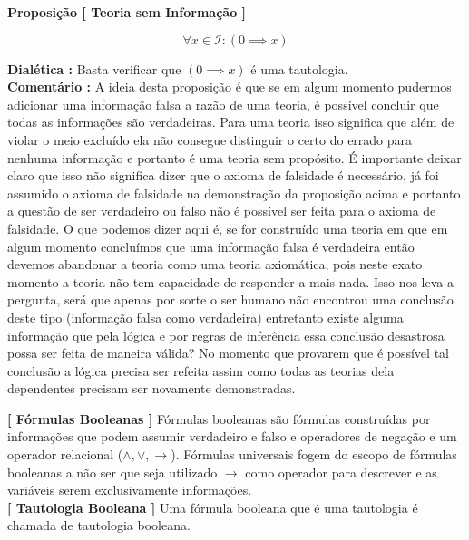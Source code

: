 \documentclass[10pt,a4paper]{report}
\begin{document}
\textbf{Proposição [ Teoria sem Informação ]}

$$ \forall x \in \mathcal{I} : (0 \implies x) $$

\textbf{Dialética :} Basta verificar que $ (0 \implies x) $ é uma tautologia.\\

\textbf{Comentário :} A ideia desta proposição é que se em algum momento pudermos adicionar uma informação falsa a razão de uma teoria, é possível concluir que todas as informações são verdadeiras. Para uma teoria isso significa que além de violar o meio excluído ela não consegue distinguir o certo do errado para nenhuma informação e portanto é uma teoria sem propósito. É importante deixar claro que isso não significa dizer que o axioma de falsidade é necessário, já foi assumido o axioma de falsidade na demonstração da proposição acima e portanto a questão de ser verdadeiro ou falso não é possível ser feita para o axioma de falsidade. O que podemos dizer aqui é, se for construído uma teoria em que em algum momento concluímos que uma informação falsa é verdadeira então devemos abandonar a teoria como uma teoria axiomática, pois neste exato momento a teoria não tem capacidade de responder a mais nada. Isso nos leva a pergunta, será que apenas por sorte o ser humano não encontrou uma conclusão deste tipo (informação falsa como verdadeira) entretanto existe alguma informação que pela lógica e por regras de inferência essa conclusão desastrosa possa ser feita de maneira válida? No momento que provarem que é possível tal conclusão a lógica precisa ser refeita assim como todas as teorias dela dependentes precisam ser novamente demonstradas.

\hspace{\baselineskip}

\textbf{[ Fórmulas Booleanas ]} Fórmulas booleanas são fórmulas construídas por informações que podem assumir verdadeiro e falso e operadores de negação e um operador relacional ($\wedge, \vee, \rightarrow$). Fórmulas universais fogem do escopo de fórmulas booleanas a não ser que seja utilizado $\rightarrow$ como operador para descrever e as variáveis serem exclusivamente informações.\\

\textbf{[ Tautologia Booleana ]} Uma fórmula booleana que é uma tautologia é chamada de tautologia booleana. 

\hspace{\baselineskip}
\end{document}
